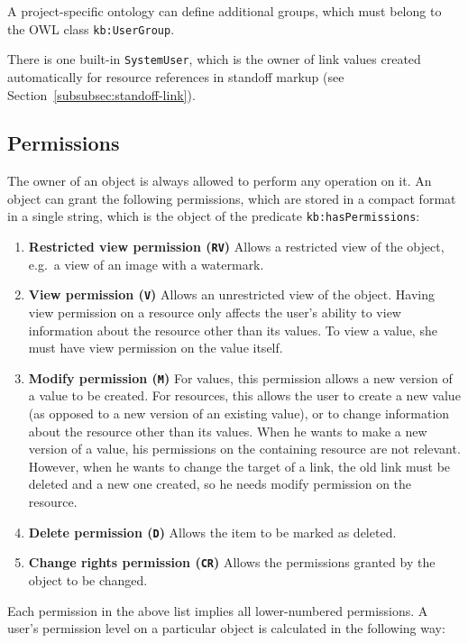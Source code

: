 \documentclass[12pt, a4paper]{article}
\begin{document}
A project-specific ontology can define additional groups, which must belong to the OWL class \texttt{kb:UserGroup}.

There is one built-in \texttt{SystemUser}, which is the owner of link values created automatically for resource references in standoff markup (see Section~\ref{subsubsec:standoff-link}).

\subsection{Permissions}

The owner of an object is always allowed to perform any operation on it. An object can grant the following permissions, which are stored in a compact format in a single string, which is the object of the predicate 
\texttt{kb:hasPermissions}:

\begin{enumerate}
	\item \textbf{Restricted view permission (\texttt{RV})} Allows a restricted view of the object, e.g.\ a view of an image with a watermark.
	\item \textbf{View permission (\texttt{V})} Allows an unrestricted view of the object. Having view permission on a resource only affects the user's ability to view information about the resource other than its values. To view a value, she must have view permission on the value itself.
	\item \textbf{Modify permission (\texttt{M})} For values, this permission allows a new version of a value to be created. For resources, this allows the user to create a new value (as opposed to a new version of an existing value), or to change information about the resource other than its values. When he wants to make a new version of a value, his permissions on the containing resource are not relevant. However, when he wants to change the target of a link, the old link must be deleted and a new one created, so he needs modify permission on the resource.
	\item \textbf{Delete permission (\texttt{D})} Allows the item to be marked as deleted.
	\item \textbf{Change rights permission (\texttt{CR})} Allows the permissions granted by the object to be changed.
\end{enumerate}

Each permission in the above list implies all lower-numbered permissions. A user's permission level on a particular object is calculated in the following way:
\end{document}
